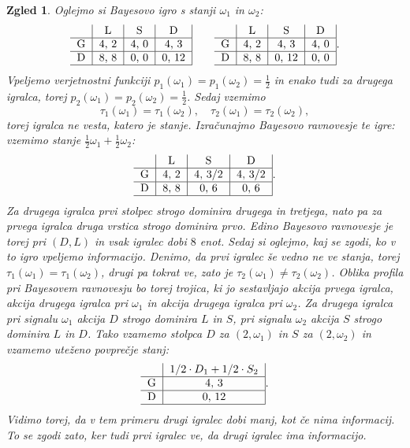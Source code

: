 \documentclass[10pt, a4paper]{article}
\newtheorem{zgled}[izr]{Zgled}
\begin{document}
\begin{zgled}
  Oglejmo si Bayesovo igro s stanji $\omega_1$ in $\omega_2$:
  $$
  {\begin{tabular}{c|c|c|c|}
    & \textrm{L} & \textrm{S} & \textrm{D}\\
    \hline
    \textrm{G} & 4, 2 & 4, 0 & 4, 3\\
    \hline
    \textrm{D} & 8, 8 & 0, 0 & 0, 12\\
    \hline
  \end{tabular}}
  \qquad
  {\begin{tabular}{c|c|c|c|}
    & \textrm{L} & \textrm{S} & \textrm{D}\\
    \hline
    \textrm{G} & 4, 2 & 4, 3 & 4, 0\\
    \hline
    \textrm{D} & 8, 8 & 0, 12 & 0, 0\\
    \hline
\end{tabular}}.
$$
Vpeljemo verjetnostni funkciji $p_1 (\omega_1) = p_1(\omega_2) = \frac{1}{2}$ in enako tudi za drugega igralca, torej 
$p_2(\omega_1) = p_2(\omega_2) = \frac{1}{2}$. Sedaj vzemimo 
$$\tau_1 (\omega_1) = \tau_1 (\omega_2),\quad \tau_2 (\omega_1) = \tau_2 (\omega_2),$$
torej igralca ne vesta, katero je stanje. Izračunajmo Bayesovo ravnovesje te igre:
vzemimo stanje $\frac{1}{2} \omega_1 + \frac{1}{2} \omega_2$:
$$  
{\begin{tabular}{c|c|c|c|}
  & \textrm{L} & \textrm{S} & \textrm{D}\\
  \hline
  \textrm{G} & 4, 2 & 4, 3/2 & 4, 3/2\\
  \hline
  \textrm{D} & 8, 8 & 0, 6 & 0, 6\\
  \hline
\end{tabular}}.$$
Za drugega igralca prvi stolpec strogo dominira drugega in tretjega, nato pa za prvega igralca druga vrstica strogo dominira prvo.
Edino Bayesovo ravnovesje je torej pri $(D, L)$ in vsak igralec dobi $8$ enot.
Sedaj si oglejmo, kaj se zgodi, ko v to igro vpeljemo informacijo. Denimo, da prvi igralec še vedno ne ve stanja, torej 
$\tau_1 (\omega_1) = \tau_1 (\omega_2)$, drugi pa tokrat ve, zato je $\tau_2 (\omega_1) \neq \tau_2 (\omega_2)$.
Oblika profila pri Bayesovem ravnovesju bo torej trojica, ki jo sestavljajo akcija prvega igralca, akcija drugega igralca pri $\omega_1$ in akcija drugega igralca 
pri $\omega_2$. Za drugega igralca pri signalu $\omega_1$ akcija $D$ strogo dominira $L$ in $S$,
pri signalu $\omega_2$ akcija $S$ strogo dominira $L$ in $D$. Tako vzamemo stolpca $D$ za $(2, \omega_1)$ in $S$ za $(2, \omega_2)$ in vzamemo 
uteženo povprečje stanj:
$$  
{\begin{tabular}{c|c|}
   & $1/2 \cdot D_1 + 1/2 \cdot S_2$\\
  \hline
  \textrm{G} & 4, 3\\
  \hline
  \textrm{D} & 0, 12\\
  \hline
\end{tabular}}.$$
Vidimo torej, da v tem primeru drugi igralec dobi manj, kot če nima informacij.
To se zgodi zato, ker tudi prvi igralec ve, da drugi igralec ima informacijo.
\end{zgled}
\end{document}
